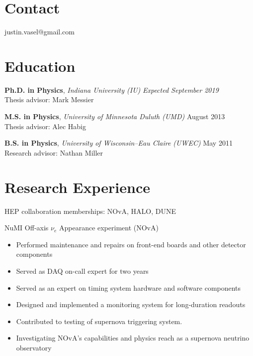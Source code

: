 \documentclass[11pt]{cv}
\begin{document}

\begin{cv}


\section{Contact}
justin.vasel@gmail.com


\section{Education}

\textbf{Ph.D. in Physics}, \emph{Indiana University (IU)} \hfill \emph{Expected September 2019} \\
Thesis advisor: Mark Messier

\textbf{M.S. in Physics}, \emph{University of Minnesota Duluth (UMD)} \hfill August 2013 \\
Thesis advisor: Alec Habig

\textbf{B.S. in Physics}, \emph{University of Wisconsin--Eau Claire (UWEC)} \hfill May 2011 \\
Research advisor: Nathan Miller


\section{Research Experience}

HEP collaboration memberships: NOvA, HALO, DUNE

NuMI Off-axis $\nu_e$ Appearance experiment (NOvA)
\begin{itemize}
  \item Performed maintenance and repairs on front-end boards and other detector components
  \item Served as DAQ on-call expert for two years
  \item Served as an expert on timing system hardware and software components
  \item Designed and implemented a monitoring system for long-duration readouts
  \item Contributed to testing of supernova triggering system.
  \item Investigating NOvA's capabilities and physics reach as a supernova neutrino observatory
\end{itemize}


\end{cv}
\end{document}
